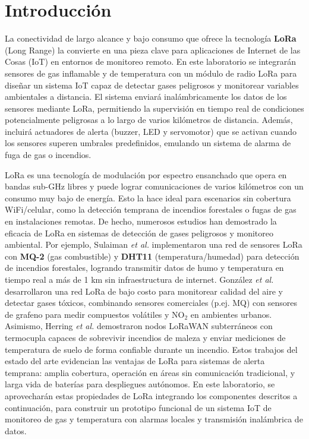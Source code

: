 \section{Introducción}
La conectividad de largo alcance y bajo consumo que ofrece la tecnología \textbf{LoRa} (Long Range) la convierte en una pieza clave para aplicaciones de Internet de las Cosas (IoT) en entornos de monitoreo remoto. En este laboratorio se integrarán sensores de gas inflamable y de temperatura con un módulo de radio LoRa para diseñar un sistema IoT capaz de detectar gases peligrosos y monitorear variables ambientales a distancia. El sistema enviará inalámbricamente los datos de los sensores mediante LoRa, permitiendo la supervisión en tiempo real de condiciones potencialmente peligrosas a lo largo de varios kilómetros de distancia. Además, incluirá actuadores de alerta (buzzer, LED y servomotor) que se activan cuando los sensores superen umbrales predefinidos, emulando un sistema de alarma de fuga de gas o incendios.

LoRa es una tecnología de modulación por espectro ensanchado que opera en bandas sub-GHz libres y puede lograr comunicaciones de varios kilómetros con un consumo muy bajo de energía. Esto la hace ideal para escenarios sin cobertura WiFi/celular, como la detección temprana de incendios forestales o fugas de gas en instalaciones remotas. De hecho, numerosos estudios han demostrado la eficacia de LoRa en sistemas de detección de gases peligrosos y monitoreo ambiental. Por ejemplo, Sulaiman \textit{et al.} implementaron una red de sensores LoRa con \textbf{MQ-2} (gas combustible) y \textbf{DHT11} (temperatura/humedad) para detección de incendios forestales, logrando transmitir datos de humo y temperatura en tiempo real a más de 1 km sin infraestructura de internet. González \textit{et al.} desarrollaron una red LoRa de bajo costo para monitorear calidad del aire y detectar gases tóxicos, combinando sensores comerciales (p.ej. MQ) con sensores de grafeno para medir compuestos volátiles y NO$_2$ en ambientes urbanos. Asimismo, Herring \textit{et al.} demostraron nodos LoRaWAN subterráneos con termocupla capaces de sobrevivir incendios de maleza y enviar mediciones de temperatura de suelo de forma confiable durante un incendio. Estos trabajos del estado del arte evidencian las ventajas de LoRa para sistemas de alerta temprana: amplia cobertura, operación en áreas sin comunicación tradicional, y larga vida de baterías para despliegues autónomos. En este laboratorio, se aprovecharán estas propiedades de LoRa integrando los componentes descritos a continuación, para construir un prototipo funcional de un sistema IoT de monitoreo de gas y temperatura con alarmas locales y transmisión inalámbrica de datos.

